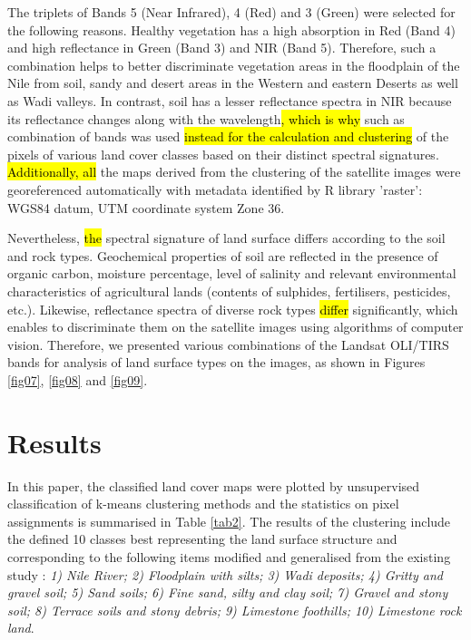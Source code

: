 \documentclass[information,article,submit,pdftex,moreauthors]{Definitions/mdpi}
\begin{document}
The triplets of Bands 5 (Near Infrared), 4 (Red) and 3 (Green) were selected for the following reasons. Healthy vegetation has a high absorption in Red (Band 4) and high reflectance in Green (Band 3) and NIR (Band 5). Therefore, such a combination helps to better discriminate vegetation areas in the floodplain of the Nile from soil, sandy and desert areas in the Western and eastern Deserts as well as Wadi valleys. In contrast, soil has a lesser reflectance spectra in NIR because its reflectance changes along with the wavelength\hl{, which is why }such as combination of bands was used \hl{instead for the calculation and clustering }of the pixels of various land cover classes based on their distinct spectral signatures. \hl{Additionally, all }the maps derived from the clustering of the satellite images were georeferenced automatically with metadata identified by R library 'raster': WGS84 datum, UTM coordinate system Zone 36.

Nevertheless, \hl{the }spectral signature of land surface differs according to the soil and rock types. Geochemical properties of soil are reflected in the presence of organic carbon, moisture percentage, level of salinity and relevant environmental characteristics of agricultural lands (contents of sulphides, fertilisers, pesticides, etc.). Likewise, reflectance spectra of diverse rock types \hl{differ }significantly, which enables to discriminate them on the satellite images using algorithms of computer vision. Therefore, we presented various combinations of the Landsat OLI/TIRS bands for analysis of land surface types on the images, as shown in Figures \ref{fig07}, \ref{fig08} and \ref{fig09}.

\section{Results}

In this paper, the classified land cover maps were plotted by unsupervised classification of k-means clustering methods and the statistics on pixel assignments is summarised in Table \ref{tab2}. The results of the clustering include the defined 10 classes best representing the land surface structure and corresponding to the following items modified and generalised from the existing study \cite{Kamel}: \emph{1) Nile River; 2) Floodplain with silts; 3) Wadi deposits; 4) Gritty and gravel soil;  5) Sand soils; 6) Fine sand, silty and clay soil; 7) Gravel and stony soil; 8) Terrace soils and stony debris; 9) Limestone foothills; 10) Limestone rock land}. 
\end{document}
